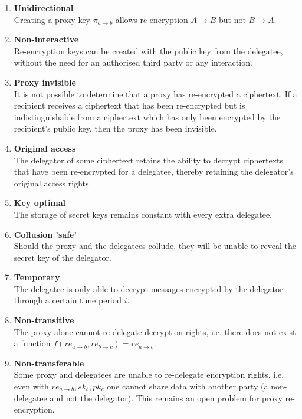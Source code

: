 \begin{enumerate}
  \item
    \textbf{Unidirectional} \\
    Creating a proxy key $\pi_{a \rightarrow b}$ allows re-encryption $A \rightarrow B$ but not $B \rightarrow A$.
  \item
    \textbf{Non-interactive} \\
    Re-encryption keys can be created with the public key from the delegatee, without the need for an authorised third party or any interaction.
  \item
    \textbf{Proxy invisible} \\
    It is not possible to determine that a proxy has re-encrypted a ciphertext. If a recipient receives a ciphertext that has been re-encrypted but is indistinguishable from a ciphertext which has only been encrypted by the recipient's public key, then the proxy has been invisible.
  \item
    \textbf{Original access} \\
    The delegator of some ciphertext retains the ability to decrypt ciphertexts that have been re-encrypted for a delegatee, thereby retaining the delegator's original access rights.
  \item
    \textbf{Key optimal} \\
    The storage of secret keys remains constant with every extra delegatee.
  \item
    \textbf{Collusion 'safe'} \\
    Should the proxy and the delegatees collude, they will be unable to reveal the secret key of the delegator.
  \item
    \textbf{Temporary} \\
    The delegatee is only able to decrypt messages encrypted by the delegator through a certain time period $i$.
  \item
    \textbf{Non-transitive} \\
    The proxy alone cannot re-delegate decryption rights, i.e. there does not exist a function $f(re_{a \rightarrow b}, re_{b \rightarrow c}) = re_{a \rightarrow c}$.
  \item
    \textbf{Non-transferable} \\
    Some proxy and delegatees are unable to re-delegate encryption rights, i.e. even with $re_{a \rightarrow b}, sk_b, pk_c$ one cannot share data with another party (a non-delegatee and not the delegator). This remains an open problem for proxy re-encryption.
\end{enumerate}

